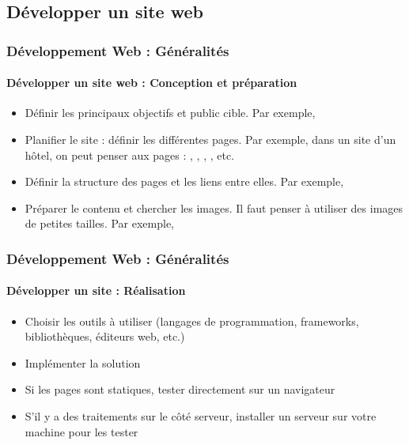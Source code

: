 \documentclass[xcolor=table]{beamer}
\begin{document}
\subsection{Développer un site web}

\begin{frame}
\frametitle{Développement Web : Généralités}
\framesubtitle{Développer un site web : Conception et préparation}

\begin{itemize}
	\item Définir les principaux objectifs et public cible. 
	Par exemple, 
	\item Planifier le site : définir les différentes pages. 
	Par exemple, dans un site d'un hôtel, on peut penser aux pages : ,  , ,  , etc.
	\item Définir la structure des pages et les liens entre elles. 
	Par exemple, 
	\item Préparer le contenu et chercher les images. 
	Il faut penser à utiliser des images de petites tailles. 
	Par exemple, 
\end{itemize}

\end{frame}

\begin{frame}
\frametitle{Développement Web : Généralités}
\framesubtitle{Développer un site : Réalisation}

\begin{itemize}
	\item Choisir les outils à utiliser (langages de programmation, frameworks, bibliothèques, éditeurs web, etc.) 
	\item Implémenter la solution 
	\item Si les pages sont statiques, tester directement sur un navigateur
	\item S'il y a des traitements sur le côté serveur, installer un serveur  sur votre machine pour les tester
\end{itemize}

\end{frame}
\end{document}
